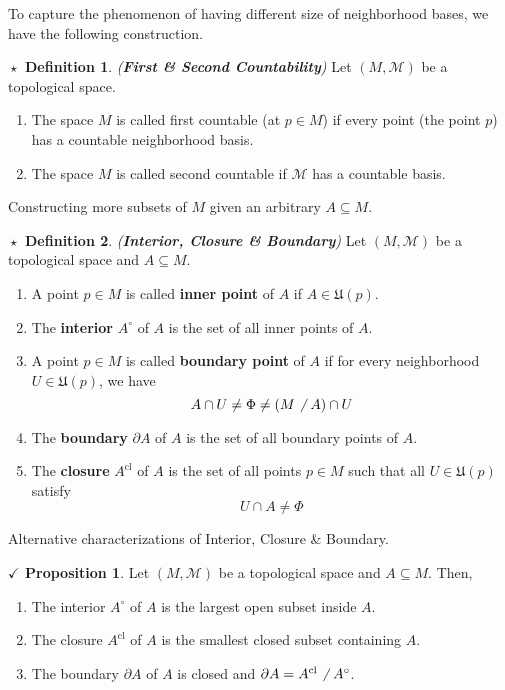 \documentclass{article}
\theoremstyle{definition}
\newtheorem{definition}{$\boxed{\star}$ Definition}
\newcommand{\tit}[1]{\textit{#1}}
\theoremstyle{remark}
\theoremstyle{definition}
\theoremstyle{definition}
\newtheorem{proposition}{$\checkmark$ Proposition}
\newcommand{\topo}[1]{\mathcal{#1}}
\newcommand{\nbdsys}[2]{\mathfrak{#1}(#2)}
\newcommand{\interior}[1]{#1^\circ}
\newcommand{\boundary}[1]{\partial #1}
\newcommand{\closure}[1]{#1^{\text{cl}}}
\begin{document}
\hrulefill
To capture the phenomenon of having different size of neighborhood bases, we have the following construction.
\hrulefill
\begin{definition}
	\tit{(\textbf{First \& Second Countability})} Let $ (M,\topo{M}) $ be a topological space.
	\begin{enumerate}
		\item{The space $ M $ is called first countable (at $ p\in M $) if every point (the point $ p $) has a countable neighborhood basis.}
		\item{The space $ M $ is called second countable if $ \topo{M} $ has a countable basis.}
	\end{enumerate}
\end{definition}
\newpage
\hrulefill
Constructing more subsets of $ M $ given an arbitrary $ A\subseteq M $.
\hrulefill
\begin{definition}
	\tit{(\textbf{Interior, Closure \& Boundary})} Let $ (M,\topo{M}) $ be a topological space and $ A\subseteq M $.
	\begin{enumerate}
		\item{A point $ p \in M$ is called \textbf{inner point} of $ A $ if $ A \in \nbdsys{U}{p} $.}
		\item{The \textbf{interior} $ \interior{A} $ of $ A $ is the set of all inner points of $ A $.}
		\item{A point $ p \in M $ is called\textbf{ boundary point }of $ A $ if for every neighborhood $ U\in \nbdsys{U}{p} $, we have 
	\[A\cap U \neq \Phi\neq (M\not\;\;A)\cap U \]	
	}
\item{The \textbf{boundary} $ \boundary{A} $ of $ A $ is the set of all boundary points of $ A $.}
\item{The \textbf{closure} $ \closure{A} $ of $ A $ is the set of all points $ p\in M $ such that all $ U\in \nbdsys{U}{p} $ satisfy 
\[U\cap A \neq \Phi\]
}
	\end{enumerate}
\end{definition}
\hrulefill
Alternative characterizations of Interior, Closure \& Boundary.
\hrulefill
\begin{proposition}
	Let $ (M,\topo{M}) $ be a topological space and $ A\subseteq M $. Then,
	\begin{enumerate}
		\item{The interior $ \interior{A} $ of $ A $ is the largest open subset inside $ A $.}
		\item{The closure $ \closure{A} $ of $ A $ is the smallest closed subset containing $ A $.}
		\item{The boundary $ \boundary{A} $ of $ A $ is closed and $ \boundary{A} = \closure{A}\not\;\;\interior{A} $.}
	\end{enumerate}
\end{proposition}
\end{document}
